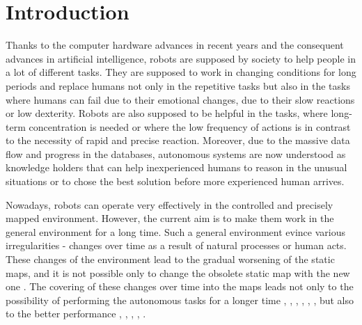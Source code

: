 \section{Introduction}

Thanks to the computer hardware advances in recent years and the consequent advances in artificial intelligence, robots are supposed by society to help people in a lot of different tasks.
They are supposed to work in changing conditions for long periods and replace humans not only in the repetitive tasks but also in the tasks where humans can fail due to their emotional changes, due to their slow reactions or low dexterity.
Robots are also supposed to be helpful in the tasks, where long-term concentration is needed or where the low frequency of actions is in contrast to the necessity of rapid and precise reaction.
Moreover, due to the massive data flow and progress in the databases, autonomous systems are now understood as knowledge holders that can help inexperienced humans to reason in the unusual situations or to chose the best solution before more experienced human arrives.

Nowadays, robots can operate very effectively in the controlled and precisely mapped environment.
However, the current aim is to make them work in the general environment for a long time.
Such a general environment evince various irregularities - changes over time as a result of natural processes or human acts.
These changes of the environment lead to the gradual worsening of the static maps, and it is not possible only to change the obsolete static map with the new one \cite{Dayoub2009adaptive}.
The covering of these changes over time into the maps leads not only to the possibility of performing the autonomous tasks for a longer time \cite{biber2009experimental}, \cite{tipaldi2013lifelong}, \cite{kucner2013conditional}, \cite{krajnik2017fremen}, \cite{churchill2013experience}, \cite{konolige2009towards}, \cite{hochdorfer2009towards}
 but also to the better performance \cite{hawes2017strands}, \cite{santos2016lifelong}, \cite{kunze2018artificial}, \cite{santos2017spatio}, \cite{hanheide2017and}.

